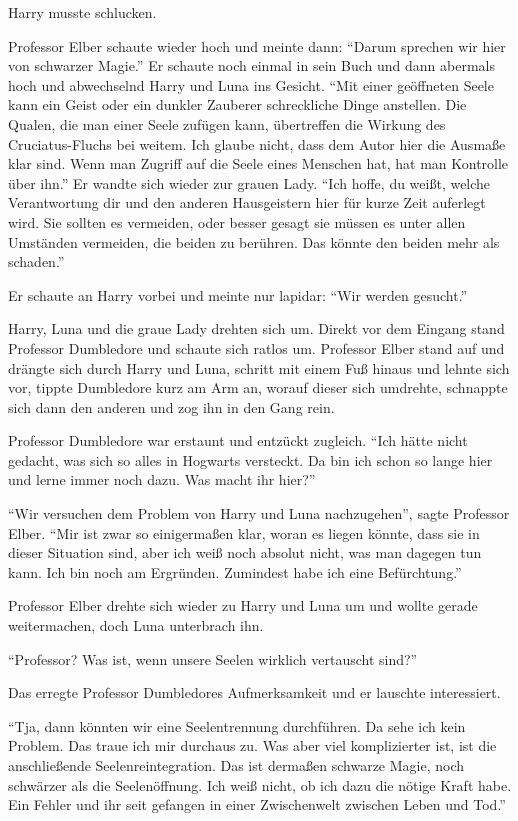 Harry musste schlucken.

Professor Elber schaute wieder hoch und meinte dann: \enquote{Darum sprechen wir hier von schwarzer Magie.} Er schaute noch einmal in sein Buch und dann abermals hoch und abwechselnd Harry und Luna ins Gesicht. \enquote{Mit einer geöffneten Seele kann ein Geist oder ein dunkler Zauberer schreckliche Dinge anstellen. Die Qualen, die man einer Seele zufügen kann, übertreffen die Wirkung des Cruciatus-Fluchs bei weitem. Ich glaube nicht, dass dem Autor hier die Ausmaße klar sind. Wenn man Zugriff auf die Seele eines Menschen hat, hat man Kontrolle über ihn.} Er wandte sich wieder zur grauen Lady. \enquote{Ich hoffe, du weißt, welche Verantwortung dir und den anderen Hausgeistern hier für kurze Zeit auferlegt wird. Sie sollten es vermeiden, oder besser gesagt sie müssen es unter allen Umständen vermeiden, die beiden zu berühren. Das könnte den beiden mehr als schaden.}

Er schaute an Harry vorbei und meinte nur lapidar: \enquote{Wir werden gesucht.}

Harry, Luna und die graue Lady drehten sich um. Direkt vor dem Eingang stand Professor Dumbledore und schaute sich ratlos um. Professor Elber stand auf und drängte sich durch Harry und Luna, schritt mit einem Fuß hinaus und lehnte sich vor, tippte Dumbledore kurz am Arm an, worauf dieser sich umdrehte, schnappte sich dann den anderen und zog ihn in den Gang rein.

Professor Dumbledore war erstaunt und entzückt zugleich. \enquote{Ich hätte nicht gedacht, was sich so alles in Hogwarts versteckt. Da bin ich schon so lange hier und lerne immer noch dazu. Was macht ihr hier?}

\enquote{Wir versuchen dem Problem von Harry und Luna nachzugehen}, sagte Professor Elber. \enquote{Mir ist zwar so einigermaßen klar, woran es liegen könnte, dass sie in dieser Situation sind, aber ich weiß noch absolut nicht, was man dagegen tun kann. Ich bin noch am Ergründen. \gst Zumindest habe ich eine Befürchtung.}

Professor Elber drehte sich wieder zu Harry und Luna um und wollte gerade weitermachen, doch Luna unterbrach ihn.

\enquote{Professor? Was ist, wenn unsere Seelen wirklich vertauscht sind?}

Das erregte Professor Dumbledores Aufmerksamkeit und er lauschte interessiert.

\enquote{Tja, dann könnten wir eine Seelentrennung durchführen. Da sehe ich kein Problem. Das traue ich mir durchaus zu. Was aber viel komplizierter ist, ist die anschließende Seelenreintegration. Das ist dermaßen schwarze Magie, noch schwärzer als die Seelenöffnung. Ich weiß nicht, ob ich dazu die nötige Kraft habe. Ein Fehler und ihr seit gefangen in einer Zwischenwelt zwischen Leben und Tod.}


